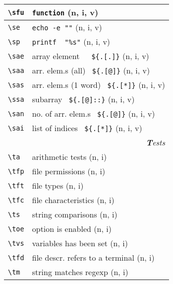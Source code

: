 \documentclass[oneside,11pt,landscape,DIV16]{scrartcl}
\begin{document}
\begin{multicols}{3}
\begin{center}
\begin{tabular}[]{|p{11mm}|p{60mm}|}
\hline \verb'\sfu' & \verb'function'                       \hfill (n, i, v)\\
%
\hline \verb'\se'  & \verb'echo -e ""'                     \hfill (n, i, v)\\
\hline \verb'\sp'  & \verb'printf  "%s"'                   \hfill (n, i, v)\\
%
\hline \verb'\sae' & array element\ \ \ \verb'${.[.]}'     \hfill (n, i, v)\\
\hline \verb'\saa' & arr. elem.s (all) \ \verb'${.[@]}'    \hfill (n, i, v)\\
\hline \verb'\sas' & arr. elem.s (1 word) \ \verb'${.[*]}' \hfill (n, i, v)\\
\hline \verb'\ssa' & subarray \ \verb'${.[@]::}'           \hfill (n, i, v)\\
\hline \verb'\san' & no. of arr. elem.s \ \verb'${.[@]}'   \hfill (n, i, v)\\
\hline \verb'\sai' & list of indices \ \verb'${.[*]}'      \hfill (n, i, v)\\
\hline
\hline
\multicolumn{2}{|r|}{\textsl{\textbf{T}ests}}                 \\[1.0ex]
\hline \verb'\ta'  & arithmetic tests                  \hfill (n, i)\\
\hline \verb'\tfp' & file permissions                  \hfill (n, i)\\
\hline \verb'\tft' & file types                        \hfill (n, i)\\
\hline \verb'\tfc' & file characteristics              \hfill (n, i)\\
\hline \verb'\ts'  & string comparisons                \hfill (n, i)\\
\hline \verb'\toe' & option is enabled                 \hfill (n, i)\\
\hline \verb'\tvs' & variables has been set            \hfill (n, i)\\
\hline \verb'\tfd' & file descr.  refers to a terminal \hfill (n, i)\\
\hline \verb'\tm'  & string matches regexp             \hfill (n, i)\\
\hline
\end{tabular}\\
%

\end{center}
\end{multicols}
\end{document}

